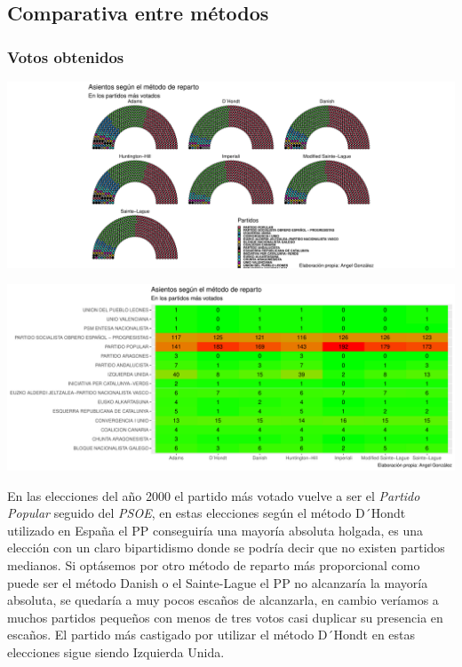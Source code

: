 \documentclass[12pt,a4paper,]{book}
\numberwithin{dummy}{section}
\theoremstyle{ocrenumbox}
\theoremstyle{blacknumex}
\theoremstyle{blacknumbox}
\theoremstyle{ocrenum}
\theoremstyle{ocrenum}
\begin{document}
\hypertarget{comparativa-entre-muxe9todos-7}{%
\subsection{Comparativa entre
métodos}\label{comparativa-entre-muxe9todos-7}}

\hypertarget{votos-obtenidos-7}{%
\subsubsection{Votos obtenidos}\label{votos-obtenidos-7}}

\begin{center}\includegraphics[width=0.95\linewidth]{figurasR/unnamed-chunk-74-1} \end{center}

\begin{center}\includegraphics[width=0.95\linewidth]{figurasR/unnamed-chunk-74-2} \end{center}

En las elecciones del año 2000 el partido más votado vuelve a ser el
\emph{Partido Popular} seguido del \emph{PSOE}, en estas elecciones
según el método D´Hondt utilizado en España el PP conseguiría una
mayoría absoluta holgada, es una elección con un claro bipartidismo
donde se podría decir que no existen partidos medianos. Si optásemos por
otro método de reparto más proporcional como puede ser el método Danish
o el Sainte-Lague el PP no alcanzaría la mayoría absoluta, se quedaría a
muy pocos escaños de alcanzarla, en cambio veríamos a muchos partidos
pequeños con menos de tres votos casi duplicar su presencia en escaños.
El partido más castigado por utilizar el método D´Hondt en estas
elecciones sigue siendo Izquierda Unida.
\end{document}
